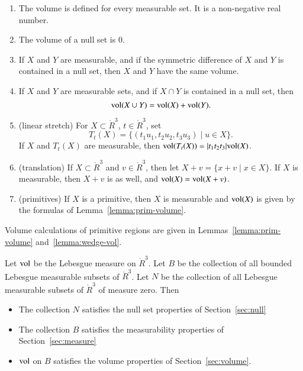 \begin{enumerate}%
 \item The volume is defined for every measurable set.  It is
    a non-negative real number.
 \item The volume of a null set is $0$.
 \item If $X$ and $Y$ are  measurable, and if
 the symmetric difference of
 $X$ and $Y$ is contained in a null set, then 
    $X$ and $Y$ have the same volume.
 \item If $X$ and $Y$ are measurable sets, and if $X\cap
 Y$ is contained in a null set, then
    $$
    {\operatorname{vol}}(X\cup Y) = {\operatorname{vol}}(X) + {\operatorname{vol}}(Y).
    $$
  \item (linear stretch) For $X\subset \ring{R}^3$, $t\in\ring{R}^3$, 
    set 
      $$
      T_t(X) = \{ (t_1u_1,t_2u_2,t_3u_3) \mid u\in X\}.
      $$
    If $X$ and $T_t(X)$ are measurable, then
     ${\operatorname{vol}}(T_t(X)) = |t_1t_2t_3|{\operatorname{vol}}(X)$.
  \item (translation) If $X\subset \ring{R}^3$ and $v\in\ring{R}^3$, then let
    $X+v = \{x + v\mid x\in X\}$.  If $X$ is measurable, then $X+v$ is
    as well, and ${\operatorname{vol}}(X) = {\operatorname{vol}}(X+v)$.
  \item (primitives) If $X$ is a primitive, then $X$ is measurable
    and ${\operatorname{vol}}(X)$ is given by the formulas of Lemma~\ref{lemma:prim-volume}.
\end{enumerate}
Volume calculations of primitive regions are given in 
Lemmas~\ref{lemma:prim-volume} and~\ref{lemma:wedge-vol}.

\begin{lemma}  Let ${\operatorname{vol}}$ be the Lebesgue measure
on $\ring{R}^3$. Let $B$ be the collection of all bounded Lebesgue
measurable subsets of $\ring{R}^3$.  Let $N$ be the collection of all
Lebesgue measurable subsets of $\ring{R}^3$ of measure zero.
Then
\begin{itemize}
\item  The collection $N$ satisfies the null set properties of Section~\ref{sec:null}
\item The collection $B$ satisfies the measurability properties of Section~\ref{sec:measure}
\item  ${\operatorname{vol}}$ on $B$ satisfies the volume properties of Section~\ref{sec:volume}.  
\end{itemize}
\end{lemma}

